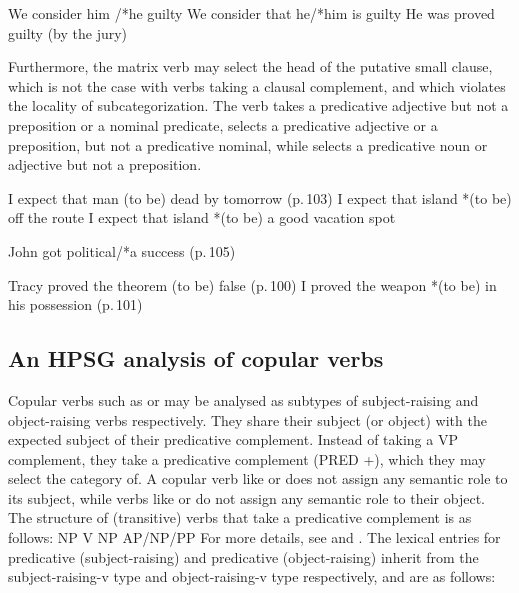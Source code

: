 \documentclass[output=paper]{langsci/langscibook}
\begin{document}
\begin{exe}
\ex \begin{xlist}
\ex We consider him /*he guilty
\ex 	We consider that he/*him is guilty
\ex 	He was proved guilty (by the jury)	
\end{xlist}
\end{exe}
	

Furthermore, the matrix verb may select the head of the putative small clause, which is not the case with verbs taking a clausal complement, and which violates the locality of subcategorization. The verb takes a predicative adjective but not a preposition or a nominal predicate,  selects a predicative adjective or a preposition, but not a predicative nominal, while  selects a predicative noun or adjective but not a preposition.


\begin{exe}
\ex \begin{xlist}
\ex I expect that man (to be) dead  by tomorrow (p.\,103)
\ex I expect that island *(to be) off the route
\ex I expect that island *(to be) a good vacation spot
\end{xlist}
\ex John got political/*a success (p.\,105)	
\ex\begin{xlist}
\ex Tracy proved the theorem (to be) false (p.\,100)
\ex  I proved the weapon *(to be) in his possession	(p.\,101)
\end{xlist}

\end{exe}
	


\subsection{An HPSG analysis of copular verbs}
	
Copular verbs such as  or  may be analysed as subtypes of subject-raising and object-raising verbs respectively. They share their subject (or object) with the expected subject of their predicative complement. Instead of taking a VP complement, they take a predicative complement (PRED +), which they may select the category of.
A copular verb like  or  does not assign any semantic role to its subject, while
verbs like  or  do not assign any semantic role to their object. The
structure of (transitive) verbs that take a predicative complement is as follows:
\ea
NP V NP AP/NP/PP
\z
For more details, see  and  . 
The lexical entries for predicative (subject-raising)  and predicative (object-raising)  inherit from the subject-raising-v type and object-raising-v type respectively, and are as follows:
\end{document}
